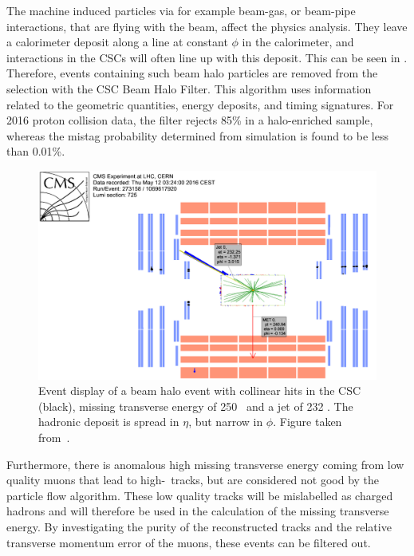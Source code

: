 The machine induced particles via for example beam-gas, or beam-pipe interactions, that are flying with the beam, affect the physics analysis. They leave a calorimeter deposit along a line at constant $\phi$ in the calorimeter, and interactions in the CSCs will often line up with this deposit. This can be seen in . Therefore, events containing such beam halo particles are removed from the selection with the CSC Beam Halo Filter. This algorithm uses information related to the geometric quantities, energy deposits, and timing signatures. For 2016 proton collision data, the filter rejects 85\% in a halo-enriched sample, whereas the mistag probability determined from simulation is found to  be less than 0.01\%.  
\begin{figure}[htbp]
	\centering
	\includegraphics[width=.7\linewidth]{5_EventSelection/Figures/Figure_004}
	\caption{Event display of a beam halo event with collinear hits in the CSC (black), missing transverse energy of 250 \GeV\, and a jet of 232 \GeV. The hadronic deposit is spread in $\eta$, but narrow in $\phi$. Figure taken from~\cite{CMS-PAS-JME-16-004}. }
	\label{fig:beamhalo}
\end{figure}

Furthermore, there is anomalous high missing transverse energy coming from low quality muons that lead to high-\pt\ tracks, but are considered not good by the particle flow algorithm. These low quality tracks will be  mislabelled as charged hadrons and will therefore be used in the calculation of the missing transverse energy. By investigating the purity of the reconstructed tracks and the relative transverse momentum error of the muons, these events can be filtered out. 





